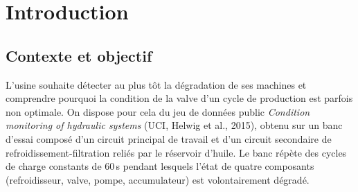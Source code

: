 \documentclass[11pt,a4paper]{article}
\providecommand{\resnFeatures}{??}\providecommand{\respctHighCorrPairs}{??}\providecommand{\resnAfterCorr}{??}
\providecommand{\restestAccuracy}{??}\providecommand{\restestPrecision}{??}\providecommand{\restestRecall}{??}
\providecommand{\restestFone}{??}\providecommand{\restestRocauc}{??}\providecommand{\restestTN}{??}
\begin{document}
\begin{abstract}
Ce projet construit un système de maintenance prédictive pour un banc d'essai hydraulique :
pour chaque cycle de production de 60 secondes, il prédit si la valve fonctionne de façon
optimale (condition = 100\,\%) ou non. Les seules données utilisées sont la pression PS2
(100\,Hz), le débit FS1 (10\,Hz) et le fichier des conditions \texttt{profile.txt}. Après un
contrôle de qualité des données, chaque cycle est résumé par \resnFeatures{} caractéristiques
physiques (statistiques globales, dynamique, fenêtres temporelles, énergie spectrale), puis
une sélection de variables est apprise à l'intérieur de pipelines \texttt{scikit-learn}.
Neuf familles de modèles sont comparées en validation croisée stratifiée, optimisées par
Grid Search et Random Search, puis le modèle retenu (\resfinalModel) est évalué une seule fois
sur les \resnTest{} derniers cycles : accuracy \restestAccuracy, F1 \restestFone, AUC
\restestRocauc. L'AUC parfaite montre que le modèle classe correctement tous les cycles,
mais son seuil de décision est décalé par un changement de distribution entre
entraînement et test : toutes ses erreurs sont des valves à 90\,\% prédites optimales, alors
que les modèles non linéaires (SVM, forêt aléatoire, gradient boosting) atteignent 100\,\%
sur le test. L'analyse des variables identifie la cause physique d'une valve non optimale :
un \textbf{retard de la montée en pression} vers 9,4\,s dans le cycle (\resdelayNinetyMs\,ms dès
le niveau 90\,\%). Les bonus réalisés sont présentés (tests unitaires, conteneur Docker,
application web).
\end{abstract}

\tableofcontents
\newpage

\section{Introduction}

\subsection{Contexte et objectif}
L'usine souhaite détecter au plus tôt la dégradation de ses machines et comprendre pourquoi la
condition de la valve d'un cycle de production est parfois non optimale. On dispose pour cela
du jeu de données public \emph{Condition monitoring of hydraulic systems}
(UCI, Helwig et al., 2015), obtenu sur un banc d'essai composé d'un circuit principal de
travail et d'un circuit secondaire de refroidissement-filtration reliés par le réservoir
d'huile. Le banc répète des cycles de charge constants de 60\,s pendant lesquels l'état de
quatre composants (refroidisseur, valve, pompe, accumulateur) est volontairement dégradé.
\end{document}
